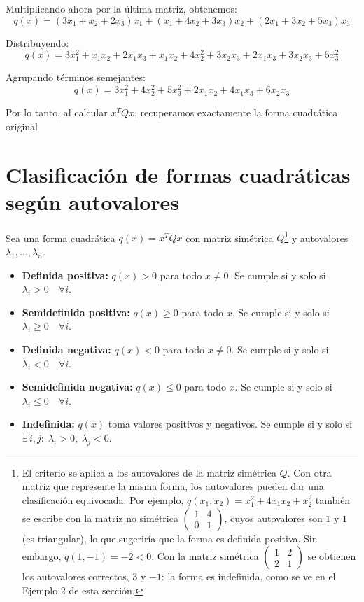\documentclass{article}
\begin{document}
Multiplicando ahora por la última matriz, obtenemos:
\[
q(x)
=
(3x_1+x_2+2x_3)x_1
+
(x_1+4x_2+3x_3)x_2
+
(2x_1+3x_2+5x_3)x_3
\]

Distribuyendo:
\[
q(x)
=
3x_1^2+x_1x_2+2x_1x_3
+
x_1x_2+4x_2^2+3x_2x_3
+
2x_1x_3+3x_2x_3+5x_3^2
\]

Agrupando términos semejantes:
\[
q(x)
=
3x_1^2
+
4x_2^2
+
5x_3^2
+
2x_1x_2
+
4x_1x_3
+
6x_2x_3
\]

{\color{teal}
Por lo tanto, al calcular \(x^TQx\), recuperamos exactamente la forma cuadrática original}


\section*{Clasificación de formas cuadráticas según autovalores}

Sea una forma cuadrática \(q(x)=x^T Q x\) con matriz simétrica \(Q\)\footnote{El criterio se aplica a los autovalores de la matriz simétrica \(Q\). Con otra matriz que represente la misma forma, los autovalores pueden dar una clasificación equivocada. Por ejemplo, \(q(x_1,x_2)=x_1^2+4x_1x_2+x_2^2\) también se escribe con la matriz no simétrica \(\left(\begin{smallmatrix}1&4\\0&1\end{smallmatrix}\right)\), cuyos autovalores son \(1\) y \(1\) (es triangular), lo que sugeriría que la forma es definida positiva. Sin embargo, \(q(1,-1)=-2<0\). Con la matriz simétrica \(\left(\begin{smallmatrix}1&2\\2&1\end{smallmatrix}\right)\) se obtienen los autovalores correctos, \(3\) y \(-1\): la forma es indefinida, como se ve en el Ejemplo 2 de esta sección.} y autovalores \(\lambda_1,\dots,\lambda_n\).

\begin{itemize}
  \item \textbf{Definida positiva:} \(q(x)>0\) para todo \(x\neq0\). Se cumple si y solo si
  \(
    \lambda_i>0 \quad\forall i
  \).

  \item \textbf{Semidefinida positiva:} \(q(x)\ge0\) para todo \(x\). Se cumple si y solo si
  \(
    \lambda_i\ge0 \quad\forall i
  \).

  \item \textbf{Definida negativa:} \(q(x)<0\) para todo \(x\neq0\). Se cumple si y solo si
  \(
    \lambda_i<0 \quad\forall i
  \).

  \item \textbf{Semidefinida negativa:} \(q(x)\le0\) para todo \(x\). Se cumple si y solo si
  \(
    \lambda_i\le0 \quad\forall i
  \).

  \item \textbf{Indefinida:} \(q(x)\) toma valores positivos y negativos. Se cumple si y solo si
  \(
    \exists\,i,j:\;\lambda_i>0,\;\lambda_j<0
  \).
\end{itemize}
\end{document}
